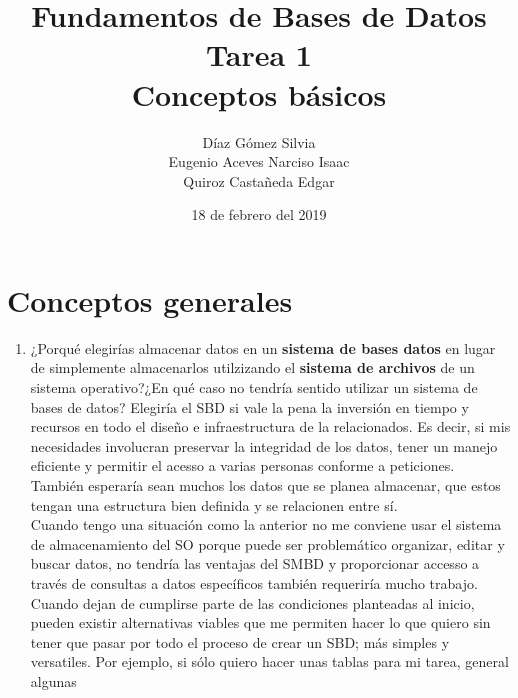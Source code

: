 \documentclass{article}
\begin{document}
    \title{Fundamentos de Bases de Datos \\
        Tarea 1 \\
        Conceptos básicos} 
    \author{Díaz Gómez Silvia \\
    Eugenio Aceves Narciso Isaac \\
    Quiroz Castañeda Edgar}
    \date{18 de febrero del 2019}
    \maketitle

    \section{Conceptos generales}

    \begin{enumerate}[label=\alph*.]
        \item {
            ¿Porqué elegirías almacenar datos en un \textbf{sistema de bases 
            datos} en lugar de simplemente almacenarlos utilzizando el 
            \textbf{sistema de archivos} de un sistema operativo?¿En qué caso no
            tendría sentido utilizar un sistema de bases de datos?
        }
            {
                Elegiría el SBD si vale la pena la inversión en tiempo y recursos
                en todo el diseño e infraestructura de la relacionados. Es decir, si mis 
                necesidades involucran preservar la integridad de los datos, tener un manejo
                eficiente y permitir el acesso a varias personas conforme a peticiones.
                También esperaría sean muchos los datos que se planea almacenar, que 
                estos tengan una estructura bien definida y se relacionen entre sí.\\
                Cuando tengo una situación como la anterior no me conviene usar el sistema
                de almacenamiento del SO porque puede ser problemático organizar, editar
                y buscar datos, no tendría las ventajas del SMBD y proporcionar accesso a
                través de consultas a datos específicos también requeriría mucho trabajo.\\
                Cuando dejan de cumplirse parte de las condiciones planteadas al inicio, pueden
                existir alternativas viables que me permiten hacer lo que quiero sin tener que 
                pasar por todo el proceso de crear un SBD; más simples y versatiles.
                Por ejemplo, si sólo quiero hacer unas tablas para mi tarea, general algunas
}
\end{enumerate}
\end{document}
